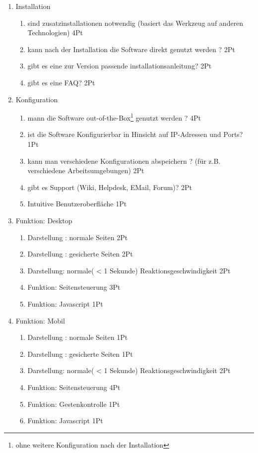 \documentclass[13pt,a4paper,oneside]{scrbook} %
\renewcommand{\\}{\bigskip}
\begin{document}
\begin{enumerate}
\item Installation 
	\begin{enumerate}
		\item sind zusatzinstallationen notwendig (basiert das Werkzeug auf anderen Technologien) 4Pt
		\item kann nach der Installation die Software direkt genutzt werden ? 2Pt
		\item gibt es eine zur Version passende installationsanleitung? 2Pt
		\item gibt es eine FAQ? 2Pt
	\end{enumerate}
	
	\item Konfiguration
	\begin{enumerate}
		\item mann die Software out-of-the-Box\footnote{ohne weitere Konfiguration nach der Installation} genutzt werden ? 4Pt
		\item ist die Software Konfigurierbar in Hinsicht auf IP-Adressen und Ports? 1Pt
		\item kann man verschiedene Konfigurationen abspeichern ? (für z.B. verschiedene Arbeitsumgebungen) 2Pt
		\item gibt es Support (Wiki, Helpdesk, EMail, Forum)? 2Pt
		\item Intuitive Benutzeroberfläche 1Pt
	\end{enumerate}
	
	\item Funktion: Desktop
	\begin{enumerate}
		\item Darstellung : normale Seiten 2Pt
		\item Darstellung : gesicherte Seiten 2Pt
		\item Darstellung: normale( < 1 Sekunde) Reaktionsgeschwindigkeit 2Pt
		\item Funktion: Seitensteuerung 3Pt
		\item Funktion: Javascript 1Pt
	\end{enumerate}
	
	\item Funktion: Mobil
	\begin{enumerate}
		\item Darstellung : normale Seiten 1Pt
		\item Darstellung : gesicherte Seiten 1Pt
		\item Darstellung: normale( < 1 Sekunde) Reaktionsgeschwindigkeit 2Pt
		\item Funktion: Seitensteuerung 4Pt
		\item Funktion: Gestenkontrolle 1Pt
		\item Funktion: Javascript 1Pt
	\end{enumerate}
	

\end{enumerate}
\end{document}
